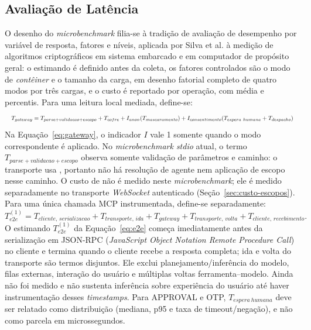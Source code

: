 \subsection{Avaliação de Latência}
O desenho do \textit{microbenchmark} filia-se à tradição de avaliação de desempenho por variável de resposta, fatores e níveis, aplicada por Silva et al. \cite{silva2016} à medição de algoritmos criptográficos em sistema embarcado e em computador de propósito geral: o estimando é definido antes da coleta, os fatores controlados são o modo de \textit{contêiner} e o tamanho da carga, em desenho fatorial completo de quatro modos por três cargas, e o custo é reportado por operação, com média e percentis. Para uma leitura local mediada, define-se:
\begin{equation}
\resizebox{\textwidth}{!}{$\displaystyle T_{gateway}=T_{parse+validacao+escopo}+T_{cofre}+I_{anon}(T_{mascaramento})+I_{consentimento}(T_{espera\ humana}+T_{despacho})$}
\label{eq:gateway}
\end{equation}
Na Equação~\eqref{eq:gateway}, o indicador $I$ vale 1 somente quando o modo correspondente é aplicado. No \textit{microbenchmark stdio} atual, o termo $T_{parse+validacao+escopo}$ observa somente validação de parâmetros e caminho: o transporte usa , portanto não há resolução de agente nem aplicação de escopo nesse caminho. O custo de  não é medido neste \textit{microbenchmark}; ele é medido separadamente no transporte \textit{WebSocket} autenticado (Seção~\ref{sec:custo-escopos}). Para uma única chamada MCP instrumentada, define-se separadamente:
\begin{equation}
T_{e2e}^{(1)}=T_{cliente,\,serializacao}+T_{transporte,\,ida}+T_{gateway}+T_{transporte,\,volta}+T_{cliente,\,recebimento}.
\label{eq:e2e}
\end{equation}
O estimando $T_{e2e}^{(1)}$ da Equação~\eqref{eq:e2e} começa imediatamente antes da serialização em JSON-RPC (\textit{JavaScript Object Notation Remote Procedure Call}) no cliente e termina quando o cliente recebe a resposta completa; ida e volta do transporte são termos disjuntos. Ele exclui planejamento/inferência do modelo, filas externas, interação do usuário e múltiplas voltas ferramenta--modelo. Ainda não foi medido e não sustenta inferência sobre experiência do usuário até haver instrumentação desses \textit{timestamps}. Para APPROVAL e OTP, $T_{espera\ humana}$ deve ser relatado como distribuição (mediana, p95 e taxa de timeout/negação), e não como parcela em microssegundos.


